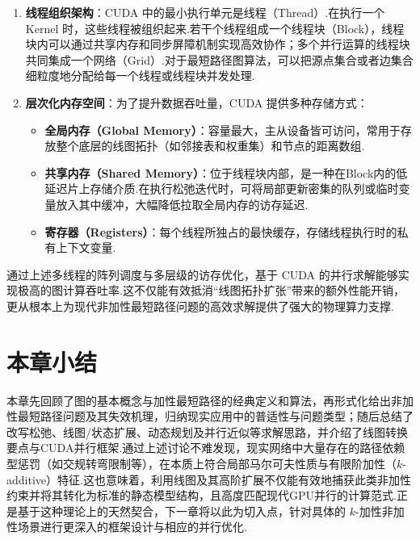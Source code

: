 \begin{enumerate}
    \item \textbf{线程组织架构}：CUDA 中的最小执行单元是线程（Thread）.在执行一个 Kernel 时，这些线程被组织起来.若干个线程组成一个线程块（Block），线程块内可以通过共享内存和同步屏障机制实现高效协作；多个并行运算的线程块共同集成一个网络（Grid）.对于最短路径图算法，可以把源点集合或者边集合细粒度地分配给每一个线程或线程块并发处理.
    \item \textbf{层次化内存空间}：为了提升数据吞吐量，CUDA 提供多种存储方式：
    \begin{itemize}
        \item \textbf{全局内存（Global Memory）}：容量最大，主从设备皆可访问，常用于存放整个底层的线图拓扑（如邻接表和权重集）和节点的距离数组.
        \item \textbf{共享内存（Shared Memory）}：位于线程块内部，是一种在Block内的低延迟片上存储介质.在执行松弛迭代时，可将局部更新密集的队列或临时变量放入其中缓冲，大幅降低拉取全局内存的访存延迟.
        \item \textbf{寄存器（Registers）}：每个线程所独占的最快缓存，存储线程执行时的私有上下文变量.
    \end{itemize}
\end{enumerate}

通过上述多线程的阵列调度与多层级的访存优化，基于 CUDA 的并行求解能够实现极高的图计算吞吐率.这不仅能有效抵消“线图拓扑扩张”带来的额外性能开销，更从根本上为现代非加性最短路径问题的高效求解提供了强大的物理算力支撑.

\section{本章小结}

本章先回顾了图的基本概念与加性最短路径的经典定义和算法，再形式化给出非加性最短路径问题及其失效机理，归纳现实应用中的普适性与问题类型；随后总结了改写松弛、线图/状态扩展、动态规划及并行近似等求解思路，并介绍了线图转换要点与CUDA并行框架.通过上述讨论不难发现，现实网络中大量存在的路径依赖型惩罚（如交规转弯限制等），在本质上符合局部马尔可夫性质与有限阶加性（$k$-additive）特征.这也意味着，利用线图及其高阶扩展不仅能有效地捕获此类非加性约束并将其转化为标准的静态模型结构，且高度匹配现代GPU并行的计算范式.正是基于这种理论上的天然契合，下一章将以此为切入点，针对具体的 $k$-加性非加性场景进行更深入的框架设计与相应的并行优化.
